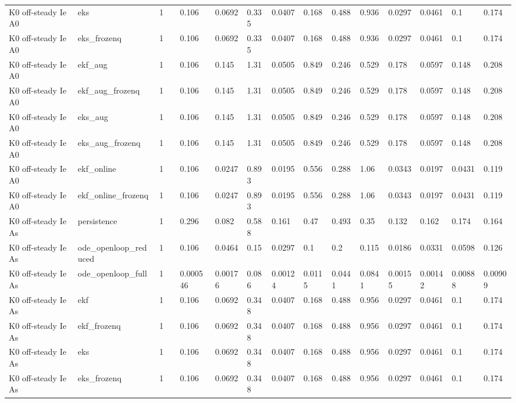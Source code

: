\begin{table}[t]
\begin{tabular}{lllllllllllllll}
K0 off-steady Ie A0 & eks & 1 &  & 0.106 & 0.0692 & 0.335 & 0.0407 & 0.168 & 0.488 & 0.936 & 0.0297 & 0.0461 & 0.1 & 0.174 \\
K0 off-steady Ie A0 & eks\_frozenq & 1 &  & 0.106 & 0.0692 & 0.335 & 0.0407 & 0.168 & 0.488 & 0.936 & 0.0297 & 0.0461 & 0.1 & 0.174 \\
K0 off-steady Ie A0 & ekf\_aug & 1 &  & 0.106 & 0.145 & 1.31 & 0.0505 & 0.849 & 0.246 & 0.529 & 0.178 & 0.0597 & 0.148 & 0.208 \\
K0 off-steady Ie A0 & ekf\_aug\_frozenq & 1 &  & 0.106 & 0.145 & 1.31 & 0.0505 & 0.849 & 0.246 & 0.529 & 0.178 & 0.0597 & 0.148 & 0.208 \\
K0 off-steady Ie A0 & eks\_aug & 1 &  & 0.106 & 0.145 & 1.31 & 0.0505 & 0.849 & 0.246 & 0.529 & 0.178 & 0.0597 & 0.148 & 0.208 \\
K0 off-steady Ie A0 & eks\_aug\_frozenq & 1 &  & 0.106 & 0.145 & 1.31 & 0.0505 & 0.849 & 0.246 & 0.529 & 0.178 & 0.0597 & 0.148 & 0.208 \\
K0 off-steady Ie A0 & ekf\_online & 1 &  & 0.106 & 0.0247 & 0.893 & 0.0195 & 0.556 & 0.288 & 1.06 & 0.0343 & 0.0197 & 0.0431 & 0.119 \\
K0 off-steady Ie A0 & ekf\_online\_frozenq & 1 &  & 0.106 & 0.0247 & 0.893 & 0.0195 & 0.556 & 0.288 & 1.06 & 0.0343 & 0.0197 & 0.0431 & 0.119 \\
K0 off-steady Ie As & persistence & 1 &  & 0.296 & 0.082 & 0.588 & 0.161 & 0.47 & 0.493 & 0.35 & 0.132 & 0.162 & 0.174 & 0.164 \\
K0 off-steady Ie As & ode\_openloop\_reduced & 1 &  & 0.106 & 0.0464 & 0.15 & 0.0297 & 0.1 & 0.2 & 0.115 & 0.0186 & 0.0331 & 0.0598 & 0.126 \\
K0 off-steady Ie As & ode\_openloop\_full & 1 &  & 0.000546 & 0.00176 & 0.086 & 0.00124 & 0.0115 & 0.0441 & 0.0841 & 0.00155 & 0.00142 & 0.00888 & 0.00909 \\
K0 off-steady Ie As & ekf & 1 &  & 0.106 & 0.0692 & 0.348 & 0.0407 & 0.168 & 0.488 & 0.956 & 0.0297 & 0.0461 & 0.1 & 0.174 \\
K0 off-steady Ie As & ekf\_frozenq & 1 &  & 0.106 & 0.0692 & 0.348 & 0.0407 & 0.168 & 0.488 & 0.956 & 0.0297 & 0.0461 & 0.1 & 0.174 \\
K0 off-steady Ie As & eks & 1 &  & 0.106 & 0.0692 & 0.348 & 0.0407 & 0.168 & 0.488 & 0.956 & 0.0297 & 0.0461 & 0.1 & 0.174 \\
K0 off-steady Ie As & eks\_frozenq & 1 &  & 0.106 & 0.0692 & 0.348 & 0.0407 & 0.168 & 0.488 & 0.956 & 0.0297 & 0.0461 & 0.1 & 0.174 \\

\end{tabular}
\end{table}
